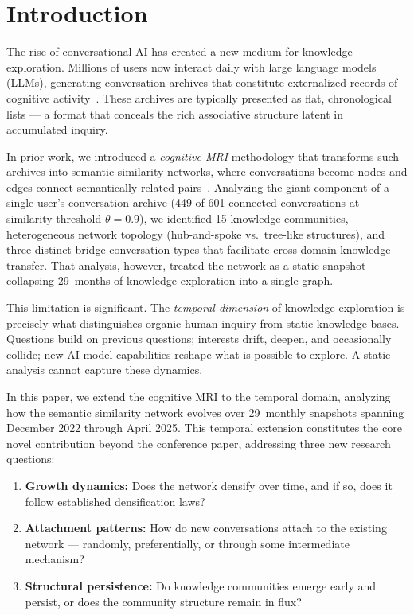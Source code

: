 \documentclass[10pt,letterpaper]{article}
\begin{document}
\section{Introduction}
\label{sec:intro}

The rise of conversational AI has created a new medium for knowledge exploration. Millions of users now interact daily with large language models (LLMs), generating conversation archives that constitute externalized records of cognitive activity~\citep{zhao2023survey}. These archives are typically presented as flat, chronological lists --- a format that conceals the rich associative structure latent in accumulated inquiry.

In prior work, we introduced a \emph{cognitive MRI} methodology that transforms such archives into semantic similarity networks, where conversations become nodes and edges connect semantically related pairs~\citep{towell2025cognitive}. Analyzing the giant component of a single user's conversation archive (449 of 601 connected conversations at similarity threshold $\theta = 0.9$), we identified 15 knowledge communities, heterogeneous network topology (hub-and-spoke vs.\ tree-like structures), and three distinct bridge conversation types that facilitate cross-domain knowledge transfer. That analysis, however, treated the network as a static snapshot --- collapsing 29~months of knowledge exploration into a single graph.

This limitation is significant. The \emph{temporal dimension} of knowledge exploration is precisely what distinguishes organic human inquiry from static knowledge bases. Questions build on previous questions; interests drift, deepen, and occasionally collide; new AI model capabilities reshape what is possible to explore. A static analysis cannot capture these dynamics.

In this paper, we extend the cognitive MRI to the temporal domain, analyzing how the semantic similarity network evolves over 29~monthly snapshots spanning December 2022 through April 2025. This temporal extension constitutes the core novel contribution beyond the conference paper, addressing three new research questions:

\begin{enumerate}
  \item \textbf{Growth dynamics:} Does the network densify over time, and if so, does it follow established densification laws?
  \item \textbf{Attachment patterns:} How do new conversations attach to the existing network --- randomly, preferentially, or through some intermediate mechanism?
  \item \textbf{Structural persistence:} Do knowledge communities emerge early and persist, or does the community structure remain in flux?
\end{enumerate}
\end{document}
